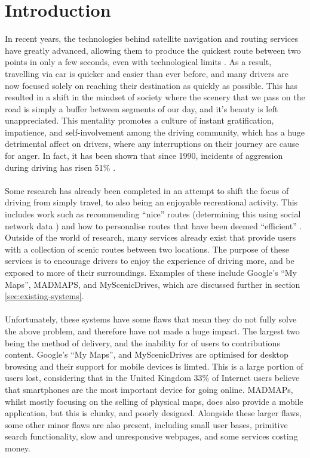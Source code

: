 \section{Introduction}
\label{sec:intro}
In recent years, the technologies behind satellite navigation and routing services have greatly advanced, allowing them to produce the quickest route between two points in only a few seconds, even with technological limits \cite{lou2009map}. As a result, travelling via car is quicker and easier than ever before, and many drivers are now focused solely on reaching their destination as quickly as possible. This has resulted in a shift in the mindset of society where the scenery that we pass on the road is simply a buffer between segments of our day, and it's beauty is left unappreciated. This mentality promotes a  culture of instant gratification, impatience, and self-involvement among the driving community, which has a huge detrimental affect on drivers, where any interruptions on their journey are cause for anger. In fact, it has been shown that since 1990, incidents of aggression during driving has risen 51\% \cite{vest1997road}. \ \\
\ \\
Some research has already been completed in an attempt to shift the focus of driving from simply travel, to also being an enjoyable recreational activity. This includes work such as recommending ``nice'' routes (determining this using social network data \cite{peregrino2012mapping}\cite{van2011time}\cite{quercia2014shortest}) and how to personalise routes that have been deemed ``efficient'' \cite{chen2011discovering}. Outside of the world of research, many services already exist that provide users with a collection of scenic routes between two locations. The purpose of these services is to encourage drivers to enjoy the experience of driving more, and be exposed to more of their surroundings. Examples of these include Google's ``My Maps''\cite{url2015gmaps}, MADMAPS\cite{url2015madmaps}, and MyScenicDrives\cite{url2015myscenicdrives}, which are discussed further in section \ref{sec:existing-systems}.\ \\
\ \\
Unfortunately, these systems have some flaws that mean they do not fully solve the above problem, and therefore have not made a huge impact. The largest two being the method of delivery, and the inability for of users to contributions content. Google's ``My Maps'', and MyScenicDrives are optimised for desktop browsing and their support for mobile devices is limted. This is a large portion of users lost, considering that in the United Kingdom 33\% of Internet users believe that smartphones are the most important device for going online\cite{ofcom2015comms}. MADMAPs, whilst mostly focusing on the selling of physical maps, does also provide a mobile application, but this is clunky, and poorly designed. Alongside these larger flaws, some other minor flaws are also present, including small user bases, primitive search functionality, slow and unresponsive webpages, and some services costing money.\ \\
